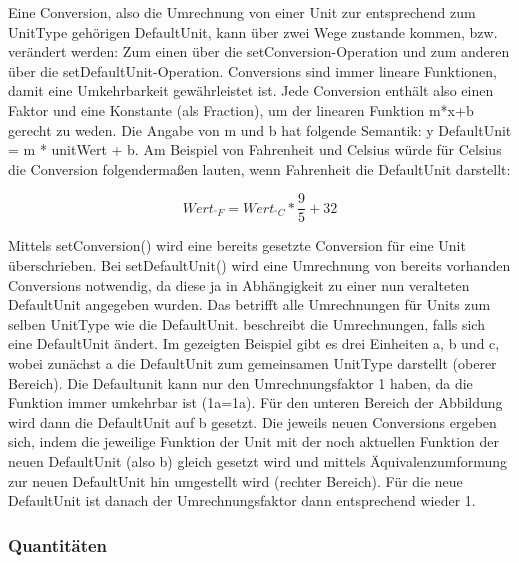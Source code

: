 \label{ConversionsKapitel} 

Eine Conversion, also die Umrechnung von einer Unit zur entsprechend zum UnitType gehörigen DefaultUnit, kann über zwei Wege zustande kommen, bzw. verändert werden: Zum einen über die setConversion-Operation und zum anderen über die setDefaultUnit-Operation.
Conversions sind immer lineare Funktionen, damit eine Umkehrbarkeit gewährleistet ist. Jede Conversion enthält also einen Faktor und eine Konstante (als Fraction), um der linearen Funktion m*x+b gerecht zu weden. Die Angabe von m und b hat folgende Semantik: y DefaultUnit = m * unitWert + b.
Am Beispiel von Fahrenheit und Celsius würde für Celsius die Conversion folgendermaßen lauten, wenn Fahrenheit die DefaultUnit darstellt:

\begin{equation} Wert_{^\circ F} = Wert_{^\circ C} * \frac{9}{5} + 32
\end{equation}

Mittels setConversion() wird eine bereits gesetzte Conversion für eine Unit überschrieben.
Bei setDefaultUnit() wird eine Umrechnung von bereits vorhanden Conversions notwendig, da diese ja in Abhängigkeit zu einer nun veralteten DefaultUnit angegeben wurden. Das betrifft alle Umrechnungen für Units zum selben UnitType wie die DefaultUnit.
 beschreibt die Umrechnungen, falls sich eine DefaultUnit ändert.
Im gezeigten Beispiel gibt es drei Einheiten a, b und c, wobei zunächst a die DefaultUnit zum gemeinsamen UnitType darstellt (oberer Bereich). Die Defaultunit kann nur den Umrechnungsfaktor 1 haben, da die Funktion immer umkehrbar ist (1a=1a). Für den unteren Bereich der Abbildung wird dann die DefaultUnit auf b gesetzt. Die jeweils neuen Conversions ergeben sich, indem die jeweilige Funktion der Unit mit der noch aktuellen Funktion der neuen DefaultUnit (also b) gleich gesetzt wird und mittels Äquivalenzumformung zur neuen DefaultUnit hin umgestellt wird (rechter Bereich). Für die neue DefaultUnit ist danach der Umrechnungsfaktor dann entsprechend wieder 1.

\subsubsection{Quantitäten}\label{Quantitaeten}



